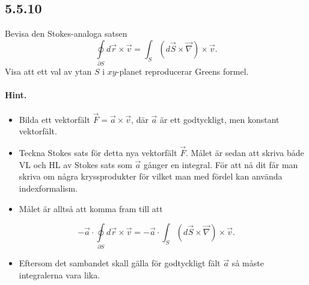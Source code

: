 \documentclass[%
oneside,                 %
final,                   %
10pt]{article}
\newenvironment{doconceexercise}{}{}
\newcounter{doconceexercisecounter}
\begin{document}
\begin{doconceexercise}

\subsection{5.5.10}

Bevisa den Stokes-analoga satsen 
\begin{equation*}
\oint\limits_{\partial S}d\vec{r}\times\vec v
       =\int_S(d\vec S\times\vec{\nabla})\times\vec v.
\end{equation*}
Visa att ett val
av ytan $S$ i $xy$-planet reproducerar Greens formel.


\paragraph{Hint.}
\begin{itemize}
\item Bilda ett vektorfält $\vec{F} = \vec{a} \times \vec{v}$, där $\vec{a}$ är ett godtyckligt, men konstant vektorfält. 

\item Teckna Stokes sats för detta nya vektorfält $\vec{F}$. Målet är sedan att skriva både VL och HL av Stokes sats som $\vec{a}$ gånger en integral. För att nå dit får man skriva om några kryssprodukter för vilket man med fördel kan använda indexformalism.

\item Målet är alltså att komma fram till att
\end{itemize}

\noindent
$$
-\vec{a} \cdot \oint\limits_{\partial S}d\vec{r}\times\vec v = -\vec{a} \cdot \int_S(d\vec S\times\vec{\nabla})\times\vec v.
$$
\begin{itemize}
\item Eftersom det sambandet skall gälla för godtyckligt fält $\vec{a}$ så måste integralerna vara lika.
\end{itemize}

\noindent

\end{doconceexercise}
\end{document}
